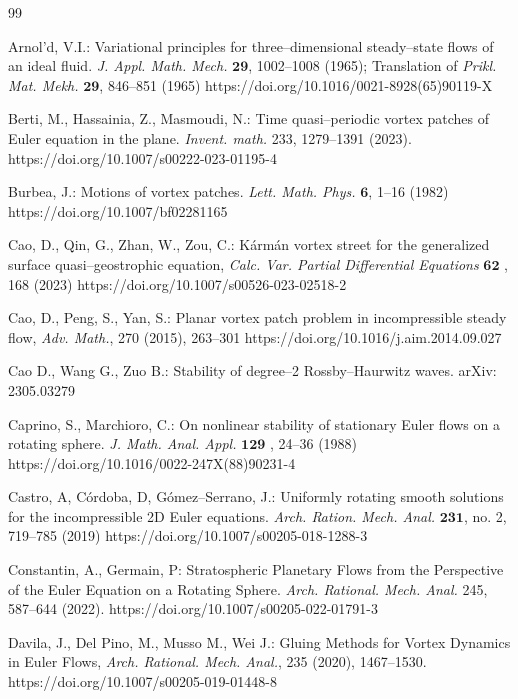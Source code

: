 \documentclass[12pt,reqno]{amsart}
\numberwithin{equation}{section}
\theoremstyle{definition}
\theoremstyle{remark}
\begin{document}
	
	\begin{thebibliography}{99}
		
	
	Arnol'd, V.I.: Variational principles for three--dimensional steady--state flows of an ideal fluid. \textit{J. Appl. Math. Mech.} $\boldsymbol{29}$, 1002--1008 (1965); Translation of \textit{Prikl. Mat. Mekh.} $\boldsymbol{29}$, 846--851 (1965) https://doi.org/10.1016/0021-8928(65)90119-X
	
	
	Berti, M., Hassainia, Z., Masmoudi, N.: Time quasi--periodic vortex patches of Euler equation in the plane. \textit{Invent. math.} 233, 1279--1391 (2023). https://doi.org/10.1007/s00222-023-01195-4
	
	
	Burbea, J.: Motions of vortex patches. \textit{Lett. Math. Phys.} $\boldsymbol{6}$, 1--16 (1982) https://doi.org/10.1007/bf02281165
	
	Cao, D., Qin, G., Zhan, W., Zou, C.: K\'arm\'an vortex street for the generalized surface quasi--geostrophic equation,
	\textit{ Calc. Var. Partial Differential Equations} $\boldsymbol{62}$ , 168 (2023) https://doi.org/10.1007/s00526-023-02518-2
	
	Cao, D., Peng, S., Yan, S.: Planar vortex patch problem in incompressible steady flow, 
	\textit{Adv. Math.}, 270 (2015), 263--301 https://doi.org/10.1016/j.aim.2014.09.027
	
	Cao D., Wang G., Zuo B.: Stability of degree--2 Rossby--Haurwitz waves. arXiv: 2305.03279
	
	
	Caprino, S., Marchioro, C.: On nonlinear stability of stationary Euler flows on a rotating sphere. \textit{J. Math. Anal. Appl.} $\boldsymbol{129}$ , 24--36 (1988) https://doi.org/10.1016/0022-247X(88)90231-4
	
	
	Castro, A, C\'ordoba, D, G\'omez--Serrano, J.: Uniformly rotating smooth solutions for the incompressible 2D Euler equations. \textit{Arch. Ration. Mech. Anal.} $\boldsymbol{231}$, no. 2, 719--785 (2019) https://doi.org/10.1007/s00205-018-1288-3
	
	Constantin, A., Germain, P: Stratospheric Planetary Flows from the Perspective of the Euler Equation on a Rotating Sphere. \textit{Arch. Rational. Mech. Anal.} 245, 587--644 (2022). https://doi.org/10.1007/s00205-022-01791-3
	
	
	Davila, J., Del Pino, M., Musso M., Wei J.: Gluing Methods for Vortex Dynamics in Euler Flows,
	\textit{Arch. Rational. Mech. Anal.}, 235 (2020), 1467--1530. https://doi.org/10.1007/s00205-019-01448-8
	

\end{thebibliography}
\end{document}
